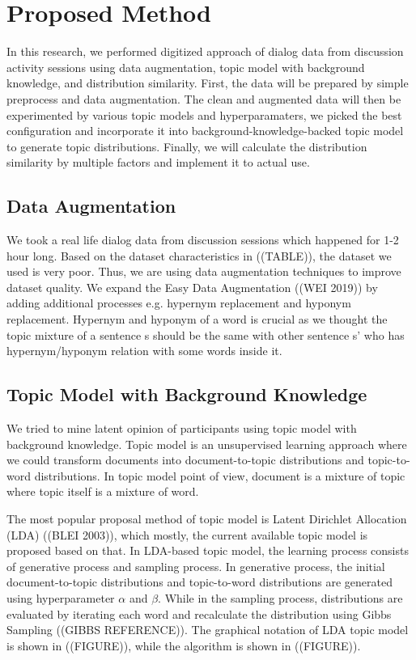 \documentclass[conference]{IEEEtran}
\begin{document}
\section{Proposed Method}
In this research, we performed digitized approach of dialog data from discussion activity sessions using data augmentation, topic model with background knowledge, and distribution similarity. First, the data will be prepared by simple preprocess and data augmentation. The clean and augmented data will then be experimented by various topic models and hyperparamaters, we picked the best configuration and incorporate it into background-knowledge-backed topic model to generate topic distributions. Finally, we will calculate the distribution similarity by multiple factors and implement it to actual use.

\subsection{Data Augmentation}
We took a real life dialog data from discussion sessions which happened for 1-2 hour long. Based on the dataset characteristics in ((TABLE)), the dataset we used is very poor. Thus, we are using data augmentation techniques to improve dataset quality. We expand the Easy Data Augmentation ((WEI 2019)) by adding additional processes e.g. hypernym replacement and hyponym replacement. Hypernym and hyponym of a word is crucial as we thought the topic mixture of a sentence s should be the same with other sentence s' who has hypernym/hyponym relation with some words inside it.

\subsection{Topic Model with Background Knowledge}
We tried to mine latent opinion of participants using topic  model with background knowledge. Topic model is an unsupervised learning approach where we could transform documents into document-to-topic distributions and topic-to-word distributions. In topic model point of view, document is a mixture of topic where topic itself is a mixture of word. 

The most popular proposal method of topic model is Latent Dirichlet Allocation (LDA) ((BLEI 2003)), which mostly, the current available topic model is proposed based on that. In LDA-based topic model, the learning process consists of generative process and sampling process. In generative process, the initial document-to-topic distributions and topic-to-word distributions are generated using hyperparameter $\alpha$ and $\beta$. While in the sampling process, distributions are evaluated by iterating each word and recalculate the distribution using Gibbs Sampling ((GIBBS REFERENCE)). The graphical notation of LDA topic model is shown in ((FIGURE)), while the algorithm is shown in ((FIGURE)).
\end{document}
